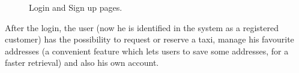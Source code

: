 \begin{figure}
	\hfill%
	\caption{Login and Sign up pages.}\label{fig:loginSignup}
\end{figure}

After the login, the user (now he is identified in the system as a registered customer) has the possibility to request or reserve a taxi, manage his favourite addresses (a convenient feature which lets users to save some addresses, for a faster retrieval) and also his own account.


